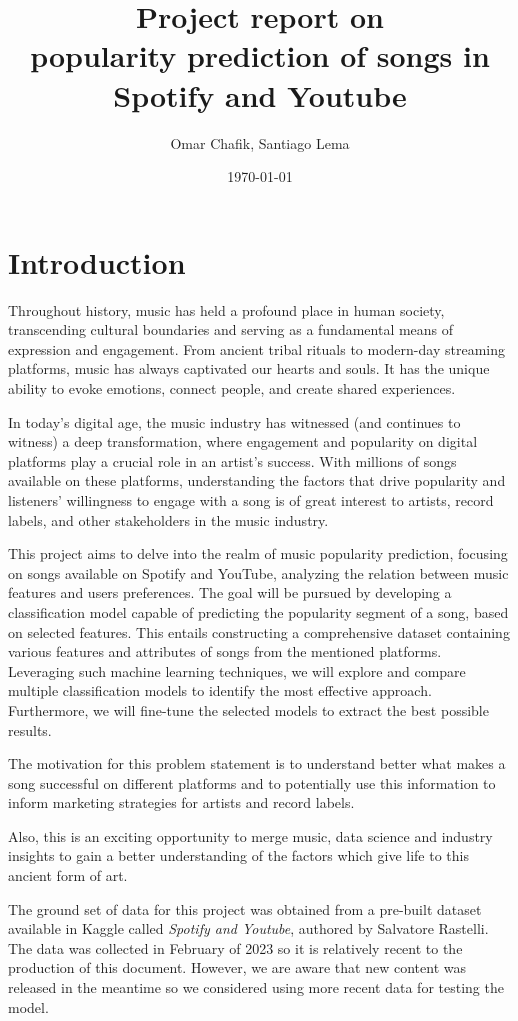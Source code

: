 \documentclass[11pt]{article} %
\title{Project report on\\
popularity prediction of songs in Spotify and Youtube \\
}
\author{Omar Chafik, Santiago Lema}
\date{\today}
\begin{document}
\maketitle

\section{Introduction}

Throughout history, music has held a profound place in human society, transcending cultural boundaries and serving as a fundamental means of expression and engagement. From ancient tribal rituals to modern-day streaming platforms, music has always captivated our hearts and souls. It has the unique ability to evoke emotions, connect people, and create shared experiences.

In today's digital age, the music industry has witnessed (and continues to witness) a deep transformation, where engagement and popularity on digital platforms play a crucial role in an artist's success. With millions of songs available on these platforms, understanding the factors that drive popularity and listeners' willingness to engage with a song is of great interest to artists, record labels, and other stakeholders in the music industry.

This project aims to delve into the realm of music popularity prediction, focusing on songs available on Spotify and YouTube, analyzing the relation between music features and users preferences. The goal will be pursued by developing  a classification model capable of predicting the popularity segment of a song, based on selected features. This entails constructing a comprehensive dataset containing various features and attributes of songs from the mentioned platforms. Leveraging such machine learning techniques, we will explore and compare multiple classification models to identify the most effective approach. Furthermore, we will fine-tune the selected models to extract the best possible results.

The motivation for this problem statement is to understand better  what makes a song successful on different platforms and to potentially use this information to inform marketing strategies for artists and record labels.

Also, this is an exciting opportunity to merge music, data science and industry insights to gain a better understanding of the factors which give life to this ancient form of art.

The ground set of data for this project was obtained from a pre-built dataset available in Kaggle called \textit{Spotify and Youtube}, authored by Salvatore Rastelli\cite{Rasetri}. The data was collected in February of 2023 so it is relatively recent to the production of this document. However, we are aware that new content was released in the meantime so we considered using more recent data for testing the model.
\end{document}
